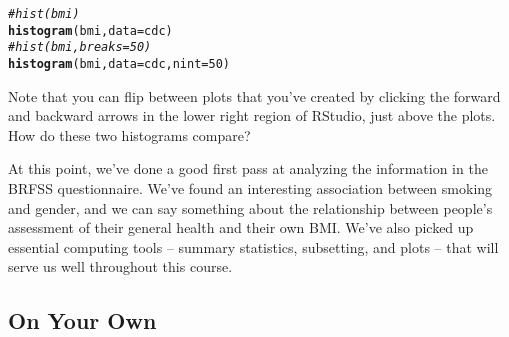 \documentclass{article}\usepackage[]{graphicx}\usepackage[]{color}
\makeatletter
\newcommand{\hlnum}[1]{\textcolor[rgb]{0.686,0.059,0.569}{#1}}%
\newcommand{\hlcom}[1]{\textcolor[rgb]{0.678,0.584,0.686}{\textit{#1}}}%
\newcommand{\hlopt}[1]{\textcolor[rgb]{0,0,0}{#1}}%
\newcommand{\hlstd}[1]{\textcolor[rgb]{0.345,0.345,0.345}{#1}}%
\newcommand{\hlkwc}[1]{\textcolor[rgb]{0.333,0.667,0.333}{#1}}%
\newcommand{\hlkwd}[1]{\textcolor[rgb]{0.737,0.353,0.396}{\textbf{#1}}}%
\newenvironment{kframe}{%
 \def\at@end@of@kframe{}%
 \ifinner\ifhmode%
  \def\at@end@of@kframe{\end{minipage}}%
  \begin{minipage}{\columnwidth}%
 \fi\fi%
 \def\FrameCommand##1{\hskip\@totalleftmargin \hskip-\fboxsep
 \colorbox{shadecolor}{##1}\hskip-\fboxsep
     \hskip-\linewidth \hskip-\@totalleftmargin \hskip\columnwidth}%
 \MakeFramed {\advance\hsize-\width
   \@totalleftmargin\z@ \linewidth\hsize
   \@setminipage}}%
 {\par\unskip\endMakeFramed%
 \at@end@of@kframe}
\newenvironment{knitrout}{}{} %
\makeatother
\begin{document}
\begin{knitrout}
\color{fgcolor}\begin{kframe}
\begin{alltt}
\hlcom{# hist(bmi)}
\hlkwd{histogram}\hlstd{(}\hlopt{\mytilde}\hlstd{bmi,} \hlkwc{data} \hlstd{= cdc)}
\hlcom{# hist(bmi, breaks = 50)}
\hlkwd{histogram}\hlstd{(}\hlopt{\mytilde}\hlstd{bmi,} \hlkwc{data} \hlstd{= cdc,} \hlkwc{nint} \hlstd{=} \hlnum{50}\hlstd{)}
\end{alltt}
\end{kframe}
\end{knitrout}

Note that you can flip between plots that you've created by clicking the forward and backward arrows in the lower right region of RStudio, just above the plots.  How do these two histograms compare?

At this point, we've done a good first pass at analyzing the information in the BRFSS questionnaire.  We've found an interesting association between smoking and gender, and we can say something about the relationship between people's assessment of their general health and their own BMI.  We've also picked up essential computing tools -- summary statistics, subsetting, and plots -- that will serve us well throughout this course.

\vfill

\subsection*{On Your Own}
\end{document}
